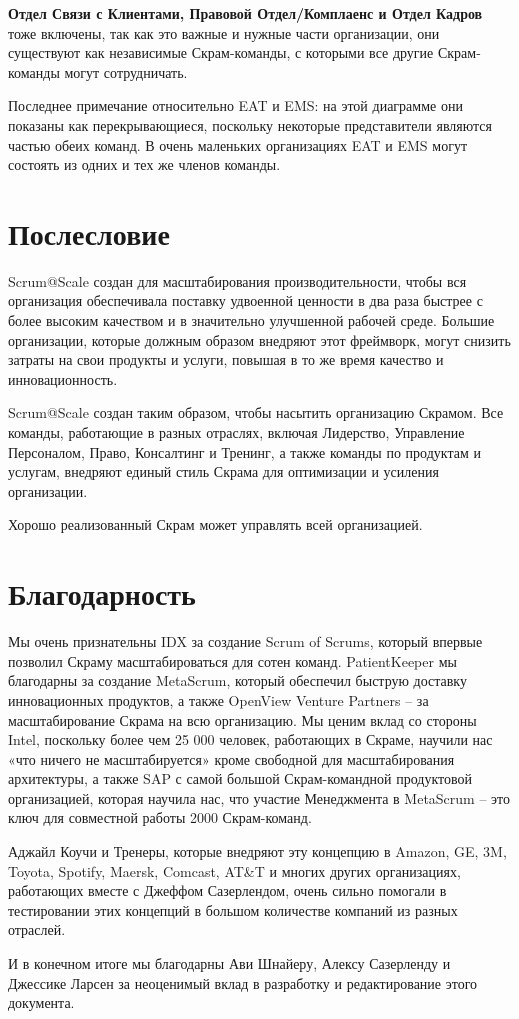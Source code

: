 \documentclass[12pt,a4paper,parskip=full]{scrartcl}
\begin{document}
\textbf{Отдел Связи с Клиентами, Правовой Отдел/Комплаенс и Отдел Кадров} тоже включены, так как это важные и нужные части организации, они существуют как независимые Скрам-команды, с которыми все другие Скрам-команды могут сотрудничать. 

Последнее примечание относительно EAT и EMS: на этой диаграмме они показаны как перекрывающиеся, поскольку некоторые представители являются частью обеих команд. В очень маленьких организациях EAT и EMS могут состоять из одних и тех же членов команды.

\section{Послесловие}

Scrum@Scale создан для масштабирования производительности, чтобы вся организация обеспечивала поставку удвоенной ценности в два раза быстрее с более высоким качеством и в значительно улучшенной рабочей среде. Большие организации, которые должным образом внедряют этот фреймворк, могут снизить затраты на свои продукты и услуги,  повышая в то же время качество и инновационность. 

Scrum@Scale создан таким образом, чтобы насытить организацию Скрамом. Все команды, работающие в разных отраслях, включая Лидерство, Управление Персоналом, Право, Консалтинг и Тренинг, а также команды по продуктам и услугам, внедряют единый стиль Скрама для оптимизации и усиления организации. 

Хорошо реализованный Скрам может управлять всей организацией. 


\section{Благодарность}

Мы очень признательны IDX за создание Scrum of Scrums, который впервые позволил Скраму масштабироваться для сотен команд. PatientKeeper мы благодарны за создание MetaScrum, который обеспечил быструю доставку инновационных продуктов, а также OpenView Venture Partners – за масштабирование Скрама на всю организацию. Мы ценим вклад со стороны Intel, поскольку более чем 25 000 человек, работающих в Скраме, научили нас «что ничего не масштабируется» кроме свободной для масштабирования архитектуры, а также SAP с самой большой Скрам-командной продуктовой организацией, которая научила нас, что участие Менеджмента в MetaScrum – это ключ для совместной работы 2000 Скрам-команд. 

Аджайл Коучи и Тренеры, которые внедряют эту концепцию в Amazon, GE, 3M, Toyota, Spotify, Maersk, Comcast, AT\&T и многих других организациях, работающих вместе с Джеффом Сазерлендом, очень сильно помогали в тестировании этих концепций в большом количестве компаний из разных отраслей. 

И в конечном итоге мы благодарны Ави Шнайеру, Алексу Сазерленду и Джессике Ларсен за неоценимый вклад в разработку и редактирование этого документа. 

\pagebreak

\printbibliography
\end{document}
